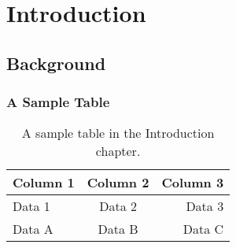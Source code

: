 \chapter{Introduction}
\lipsum[3-4]

\section{Background}
\lipsum[5]

\subsection{A Sample Table}
\begin{table}[ht]
    \centering
    \begin{tabular}{lcr}
    \toprule
    Column 1 & Column 2 & Column 3 \\
    \midrule
    Data 1   & Data 2   & Data 3   \\
    Data A   & Data B   & Data C   \\
    \bottomrule
    \end{tabular}
    \caption{A sample table in the Introduction chapter.}
\end{table}

\lipsum[6]
